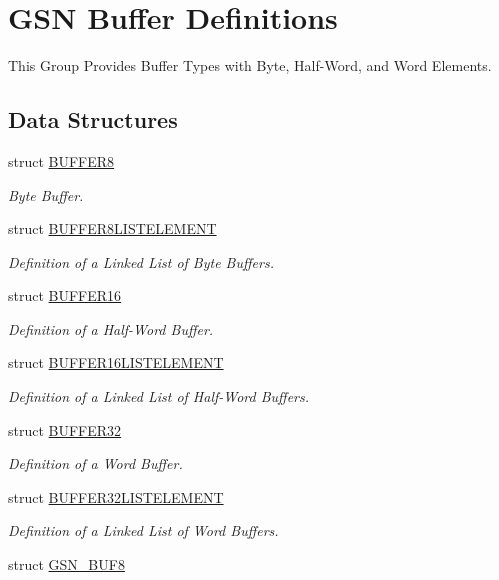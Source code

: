 \hypertarget{a00654}{
\section{GSN Buffer Definitions}
\label{a00654}
}


This Group Provides Buffer Types with Byte, Half-\/Word, and Word Elements.  


\subsection*{Data Structures}
\begin{DoxyCompactItemize}
\item 
struct \hyperlink{a00006}{BUFFER8}
\begin{DoxyCompactList}\small\item\em Byte Buffer. \end{DoxyCompactList}\item 
struct \hyperlink{a00007}{BUFFER8LISTELEMENT}
\begin{DoxyCompactList}\small\item\em Definition of a Linked List of Byte Buffers. \end{DoxyCompactList}\item 
struct \hyperlink{a00002}{BUFFER16}
\begin{DoxyCompactList}\small\item\em Definition of a Half-\/Word Buffer. \end{DoxyCompactList}\item 
struct \hyperlink{a00003}{BUFFER16LISTELEMENT}
\begin{DoxyCompactList}\small\item\em Definition of a Linked List of Half-\/Word Buffers. \end{DoxyCompactList}\item 
struct \hyperlink{a00004}{BUFFER32}
\begin{DoxyCompactList}\small\item\em Definition of a Word Buffer. \end{DoxyCompactList}\item 
struct \hyperlink{a00005}{BUFFER32LISTELEMENT}
\begin{DoxyCompactList}\small\item\em Definition of a Linked List of Word Buffers. \end{DoxyCompactList}\item 
struct \hyperlink{a00033}{GSN\_\-BUF8}

\end{DoxyCompactItemize}
